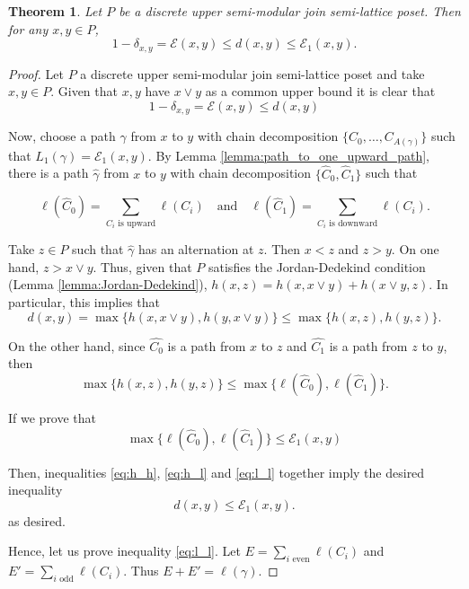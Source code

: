 \documentclass{article}[12pt]
\theoremstyle{exampstyle}
\newtheorem{theorem}{Theorem}[section]
\theoremstyle{remark}
\newcommand{\E}{\mathcal{E}}
\newcommand{\tuple}[3][1]{#2_{#1}, \dots , #2_{#3}}
\begin{document}
\begin{theorem}
    Let $P$ be a discrete upper semi-modular join semi-lattice poset. Then for any $x,y \in P$,
    \[1 - \delta_{x,y} = \E(x,y) \leq d(x,y) \leq \E_1(x,y). \]
\end{theorem}
\begin{proof}
    Let $P$ a discrete upper semi-modular join semi-lattice poset and take $x,y \in P$. Given that $x,y$ have $x \vee y$ as a common upper bound it is clear that 
    \[1 - \delta_{x,y} = \E(x,y) \leq d(x,y)\]
    
    Now, choose a path $\gamma$ from $x$ to $y$ with chain decomposition $\{ \tuple[0]{C}{A(\gamma)}\}$ such that $L_1(\gamma) = \E_1(x,y)$. By Lemma \ref{lemma:path_to_one_upward_path}, there is a path $\hat{\gamma}$ from $x$ to $y$ with chain decomposition $\{\hat{C}_0, \hat{C}_1 \}$ such that

    \[\ell(\hat{C}_0) = \sum\limits_{C_i \text{ is upward}} \ell(C_i) \quad \text{and} \quad \ell(\hat{C}_1) = \sum\limits_{C_i \text{ is downward}} \ell(C_i).\]

    Take $z \in P$ such that $\hat{\gamma}$ has an alternation at $z$. Then $x < z$ and $z > y$. On one hand,  $z > x \vee y$. Thus, given that $P$ satisfies the Jordan-Dedekind condition (Lemma \ref{lemma:Jordan-Dedekind}), $h(x,z) = h(x,x \vee y ) + h(x \vee y,z)$. In particular, this implies that 
    \begin{equation}
        d(x,y) = \max\{h(x,x \vee y), h(y,x \vee y)\} \leq \max\{h(x,z) , h(y,z)\}.
        \label{eq:h_h}
    \end{equation}

     On the other hand, since $\hat{C_0}$ is a path from $x$ to $z$ and $\hat{C_1}$ is a path from $z$ to $y$, then 
    \begin{equation}
        \max\{h(x,z), h(y,z)\} \leq \max\{\ell(\hat{C}_0) , \ell(\hat{C}_1)\}.
        \label{eq:h_l}
    \end{equation}
 
    If we prove that 
    \begin{equation}
        \max\{\ell(\hat{C}_0) , \ell(\hat{C}_1)\} \leq \E_1(x,y)
        \label{eq:l_l}
    \end{equation}

Then, inequalities \eqref{eq:h_h}, \eqref{eq:h_l} and \eqref{eq:l_l} together imply the desired inequality
\[ d(x,y) \leq \E_1(x,y).\]
as desired.

Hence, let us prove inequality \eqref{eq:l_l}. Let $E = \sum\limits_{i \text{ even}} \ell(C_i)$ and $E' = \sum\limits_{i \text{ odd}} \ell(C_i)$. Thus $E + E' = \ell(\gamma)$.


\end{proof}
\end{document}
